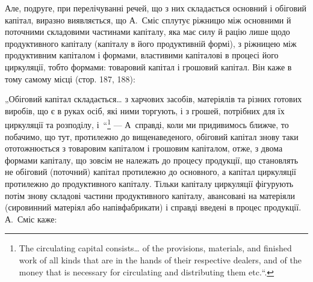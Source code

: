 
Але, подруге, при перелічуванні речей, що з них складається основний
і обіговий капітал, виразно виявляється, що А.~Сміс сплутує ріжницю
між основними й поточними складовими частинами капіталу, яка має
силу й рацію лише щодо продуктивного капіталу (капіталу в його
продуктивній формі), з ріжницею між продуктивним капіталом і формами,
властивими капіталові в процесі його циркуляції, тобто формами: товаровий
капітал і грошовий капітал. Він каже в тому самому місці (стор.
187, 188):

„Обіговий капітал складається\dots{} з харчових засобів, матеріялів
та різних готових виробів, що є в руках осіб, які ними торгують, і з
грошей, потрібних для їх циркуляції та розподілу, і~“\footnote*{
\textenglish{The circulating capital consists\dots{} of the provisions, materials, and finished work
of all kinds that are in the hands of their respective dealers, and of the money
that is necessary for circulating and distributing them etc.}“.
} — А~справді,
коли ми придивимось ближче, то побачимо, що тут, протилежно до вищенаведеного,
обіговий капітал знову таки ототожнюється з товаровим
капіталом і грошовим капіталом, отже, з двома формами капіталу, що зовсім
не належать до процесу продукції, що становлять не обіговий (поточний)
капітал протилежно до основного, а капітал циркуляції протилежно до продуктивного
капіталу. Тільки  капіталу циркуляції фігурують потім
знову складові частини продуктивного капіталу, авансовані на матеріяли
(сировинний матеріял або напівфабрикати) і справді введені в процес продукції.
А.~Сміс каже:

